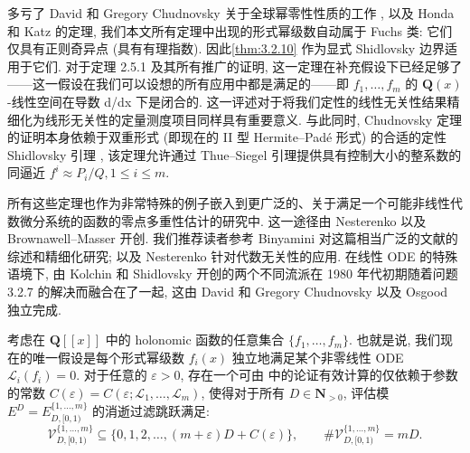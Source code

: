 \begin{remark}\label{rem:3.2.12}
多亏了 David 和 Gregory Chudnovsky 关于全球幂零性性质的工作 \cite[Prop. VIII.2.3]{DGS94}\cite[Theorem 3.1, Lemma 8.3]{CC85a}\cite[§ VI.2]{And89}, 
以及 Honda 和 Katz 的定理, 
我们本文所有定理中出现的形式幂级数自动属于 Fuchs 类: 它们仅具有正则奇异点 (具有有理指数). 
因此\autoref{thm:3.2.10} 作为显式 Shidlovsky 边界适用于它们. 
对于定理 2.5.1 及其所有推广的证明, 这一定理在补充假设下已经足够了——这一假设在我们可以设想的所有应用中都是满足的——即 \(f_1, \ldots, f_m\) 的 \(\mathbf{Q}(x)\)-线性空间在导数 d/dx 下是闭合的. 
这一评述对于将我们定性的线性无关性结果精细化为线形无关性的定量测度项目同样具有重要意义.
与此同时, Chudnovsky 定理的证明本身依赖于双重形式 (即现在的 II 型 Hermite--Pad{\'e} 形式) 的合适的定性 Shidlovsky 引理 \cite[Prop. VIII.2.3]{DGS94}\cite[Theorem 3.1, Lemma 8.3]{CC85a}\cite[§ VI.2]{And89}, 
该定理允许通过 Thue--Siegel 引理提供具有控制大小的整系数的同逼近 \(f^i \approx P_i/Q, 1 \le i \le m\).
\end{remark}

所有这些定理也作为非常特殊的例子嵌入到更广泛的、关于满足一个可能非线性代数微分系统的函数的零点多重性估计的研究中. 
这一途径由 Nesterenko \cite{Nes88} 以及 Brownawell--Masser \cite{BM80} 开创. 
我们推荐读者参考 Binyamini \cite{Bin16} 对这篇相当广泛的文献的综述和精细化研究; 
以及 Nesterenko \cite{Nes96}\cite{NP01} 针对代数无关性的应用. 
在线性 ODE 的特殊语境下, 由 Kolchin 和 Shidlovsky 开创的两个不同流派在 1980 年代初期随着问题 3.2.7 的解决而融合在了一起, 
这由 David 和 Gregory Chudnovsky \cite{CC83} 以及 Osgood \cite{Osg85} 独立完成.

\begin{theorem}\label{thm:3.2.13}
考虑在 \(\mathbf{Q}[\![x]\!]\) 中的 holonomic 函数的任意集合 \(\{f_1, \ldots, f_m\}\). 
也就是说, 我们现在的唯一假设是每个形式幂级数 \(f_i(x)\) 独立地满足某个非零线性 ODE \(\mathcal{L}_i(f_i) = 0\). 
对于任意的 \(\varepsilon > 0\), 存在一个可由 \cite[第 2 节]{CC83} 中的论证有效计算的仅依赖于参数的常数 \(C(\varepsilon) = C(\varepsilon;\mathcal{L}_1, \ldots,\mathcal{L}_m)\), 
使得对于所有 \(D \in \mathbf{N}_{>0}\), 评估模 \(E^D = E^{\{1,\dots,m\}}_{D,[0,1)}\) 的消逝过滤跳跃满足:
\begin{equation*}
\mathcal{V}_{D,[0,1)}^{\{1,\dots,m\}} \subseteq \{0,1,2,\dots,(m+\varepsilon)D + C(\varepsilon)\}, \qquad \#\mathcal{V}_{D,[0,1)}^{\{1,\dots,m\}} = mD.
\end{equation*}
\end{theorem}

